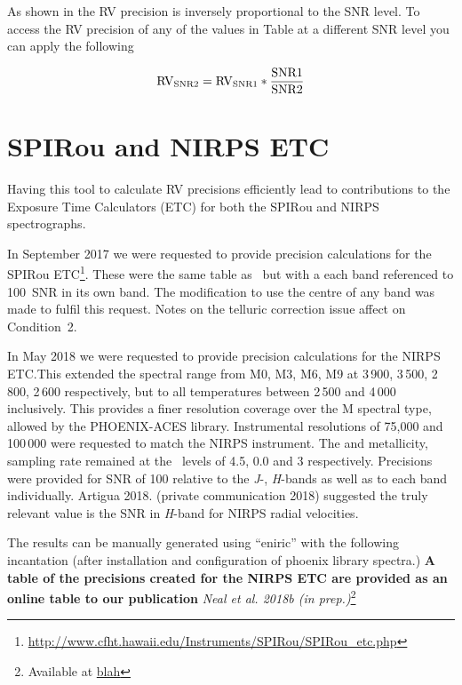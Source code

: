 As shown in  the {RV} precision is inversely proportional to the {SNR} level. To access the {RV} precision of any of the values in Table at a different {SNR} level you can apply the following

\begin{equation}
\rm RV_{SNR2} = RV_{SNR1} * \frac{SNR1}{SNR2}
\end{equation}

\section{{SPIRou} and {NIRPS} {ETC}}\label{sec:spirou_nirps_etc}
Having this tool to calculate {RV} precisions efficiently lead to contributions to the Exposure Time Calculators (ETC) for both the {SPIRou} and {NIRPS} spectrographs.

In September 2017 we were requested to provide precision calculations for the {SPIRou} ETC\footnote{\url{http://www.cfht.hawaii.edu/Instruments/SPIRou/SPIRou_etc.php}}. These were the same table as~\citet{figueira_radial_2016} but with a each band referenced to 100~{SNR} in its own band. The modification to use the centre of any band was made to fulfil this request. Notes on the telluric correction issue affect on Condition~2.

In May 2018 we were requested to provide precision calculations for the {NIRPS} {ETC}.\@ This extended the spectral range from {M0}, {M3}, {M6}, {M9} at 3\,900, 3\,500, 2\,800, 2\,600\K{} respectively, but to all temperatures between 2\,500 and 4\,000\K{} inclusively. This provides a finer resolution coverage over the M spectral type, allowed by the {PHOENIX-ACES} library.
Instrumental resolutions of 75,000 and 100\,000 were requested to match the {NIRPS} instrument.
The \logg{} and metallicity, sampling rate remained at the~\citet{figueira_radial_2016} levels of 4.5, 0.0 and 3 respectively.
Precisions were provided for {SNR} of 100 relative to the \emph{J}-, \emph{H}-bands as well as to each band individually. Artigua 2018. (private communication 2018) suggested the truly relevant value is the {SNR} in \emph{H}-band for {NIRPS} radial velocities.

The results can be manually generated using ``eniric'' with the following incantation (after installation and configuration of phoenix library spectra.)
\textbf{A table of the precisions created for the {NIRPS} ETC are provided as an online table to our publication} \textit{Neal et al. 2018b (in prep.)}\footnote{Available at \href{blah}{blah}} 


